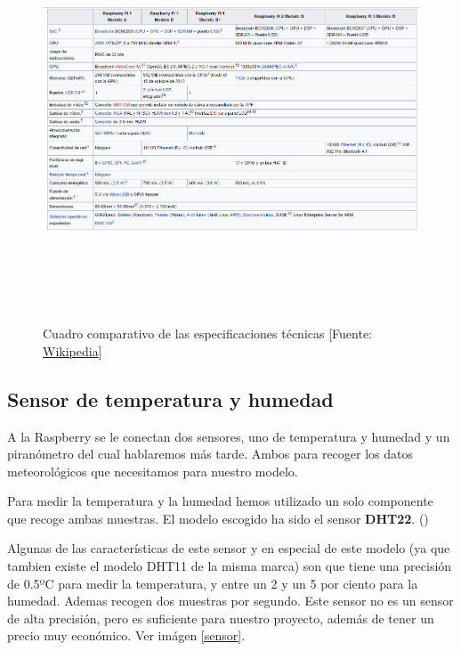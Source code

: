 \begin{figure}[htb]
	\begin{center}
		\includegraphics[width=17cm,height=12cm]{figures/Cuadro_Tipos_Raspberry.png}
		\caption{Cuadro comparativo de las especificaciones técnicas [Fuente: \href{www.wikipedia.org}{Wikipedia}]}
	\end{center}

	\label{types}
\end{figure}

\subsection{Sensor de temperatura y humedad}
\label{makereference2.3.2}

A la Raspberry se le conectan dos sensores, uno de temperatura y humedad y un piranómetro del cual hablaremos más tarde. Ambos para recoger los datos meteorológicos que necesitamos para nuestro modelo.

Para medir la temperatura y la humedad hemos utilizado un solo componente que recoge ambas muestras. El modelo escogido ha sido el sensor \textbf{DHT22}. (\cite{ARP:Adafruit:2017})

Algunas de las características de este sensor y en especial de este modelo (ya que tambien existe el modelo DHT11 de la misma marca) son que tiene una precisión de 0.5ºC para medir la temperatura, y entre un 2 y un 5 por ciento para la humedad. Ademas recogen dos muestras por segundo. Este sensor no es un sensor de alta precisión, pero es suficiente para nuestro proyecto, además de tener un precio muy económico. Ver imágen \ref{sensor}.

